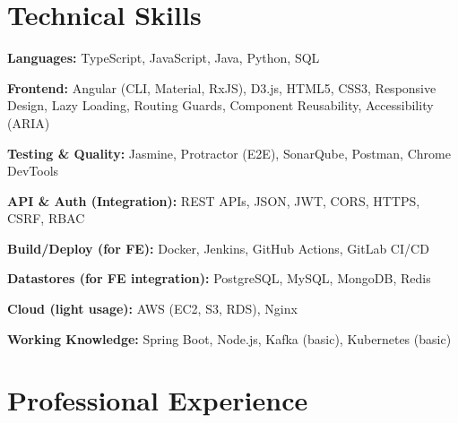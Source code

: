 \documentclass[10pt, letterpaper]{article}
\newenvironment{onecolentry}{\begin{adjustwidth}{0 cm}{0 cm}}{\end{adjustwidth}}
\begin{document}
\section{Technical Skills}
\begin{onecolentry}
    \item \textbf{Languages:} TypeScript, JavaScript, Java, Python, SQL
    \item \textbf{Frontend:} Angular (CLI, Material, RxJS), D3.js, HTML5, CSS3, Responsive Design, Lazy Loading, Routing Guards, Component Reusability, Accessibility (ARIA)
    \item \textbf{Testing \& Quality:} Jasmine, Protractor (E2E), SonarQube, Postman, Chrome DevTools
    \item \textbf{API \& Auth (Integration):} REST APIs, JSON, JWT, CORS, HTTPS, CSRF, RBAC
    \item \textbf{Build/Deploy (for FE):} Docker, Jenkins, GitHub Actions, GitLab CI/CD
    \item \textbf{Datastores (for FE integration):} PostgreSQL, MySQL, MongoDB, Redis
    \item \textbf{Cloud (light usage):} AWS (EC2, S3, RDS), Nginx
    \item \textbf{Working Knowledge:} Spring Boot, Node.js, Kafka (basic), Kubernetes (basic)
\end{onecolentry}

\newcommand{\experienceentry}[4]{%
  \noindent\textbf{#1} \hfill \textit{#2}\\
  \textit{#3} \\
  #4
}

\section{Professional Experience}
\end{document}

